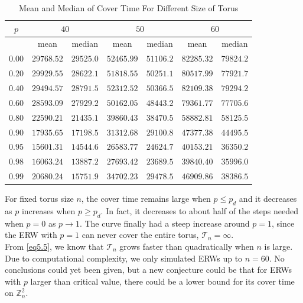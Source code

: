 \documentclass[
11pt, %
a4paper, %
oneside, %
headinclude,footinclude, %
BCOR5mm, %
]{scrartcl}
\begin{document}
\begin{table}
\caption{Mean and Median of Cover Time For Different Size of Torus}
\centering
\begin{tabular}{c|c|c|c|c|c|c}
\toprule
$p$ & \multicolumn{2}{|c|}{$40$} & \multicolumn{2}{|c|}{$50$}& \multicolumn{2}{|c}{$60$}\\
\midrule
\quad & mean & median & mean & median & mean & median\\
$0.00$ & $29768.52$ & $29525.0$ & $52465.99$ & $51106.2$ & $82285.32$ & $79824.2$\\
$0.20$ & $29929.55$ & $28622.1$ & $51818.55$ & $50251.1$ & $80517.99$ & $77921.7$\\
$0.40$ & $29494.57$ & $28791.5$ & $52312.52$ & $50366.5$ & $82109.38$ & $79294.2$\\
$0.60$ & $28593.09$ & $27929.2$ & $50162.05$ & $48443.2$ & $79361.77$ & $77705.6$\\
$0.80$ & $22590.21$ & $21435.1$ & $39860.43$ & $38470.5$ & $58882.81$ & $58125.5$\\
$0.90$ & $17935.65$ & $17198.5$ & $31312.68$ & $29100.8$ & $47377.38$ & $44495.5$\\
$0.95$ & $15601.31$ & $14544.6$ & $26583.77$ & $24624.7$ & $40153.21$ & $36350.2$\\
$0.98$ & $16063.24$ & $13887.2$ & $27693.42$ & $23689.5$ & $39840.40$ & $35996.0$\\
$0.99$ & $20680.24$ & $15751.9$ & $34702.23$ & $29478.5$ & $46909.86$ & $38386.5$\\
\bottomrule
\end{tabular}
\label{data}
\end{table}
For fixed torus size $n$, the cover time remains large when $p \leq p_d$ and it decreases as $p$ increases when $p \geq p_d$. In fact, it decreases to about half of the steps needed when $p=0$ as $p \rightarrow 1$. The curve finally had a steep increase around $p=1$, since the ERW with $p = 1$ can never cover the entire torus, $\mathcal{T}_n=\infty$.
\vspace{0.6em}\\From \eqref{eq5.5}, we know that $\mathcal{T}_n$ grows faster than quadratically when $n$ is large. Due to computational complexity, we only simulated ERWs up to $n=60$. No conclusions could yet been given, but a new conjecture could be that for ERWs with $p$ larger than critical value, there could be a lower bound for its cover time on $\mathbb{Z}_n^2$.



\clearpage
\renewcommand{\refname}{\spacedlowsmallcaps{References}} %




\end{document}

